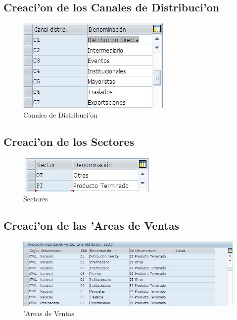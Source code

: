 \subsection*{Creaci'on de los Canales de Distribuci'on}
\begin{figure}[H]
\centering
\includegraphics[scale=0.65,type=jpg,ext=.jpg,read=.jpg]{figures/CanalesDistribucion}
\caption{Canales de Distribuci'on}
\label{fig:canales}
\end{figure}

\subsection*{Creaci'on de los Sectores}
\begin{figure}[H]
\centering
\includegraphics[scale=0.65,type=jpg,ext=.jpg,read=.jpg]{figures/Sectores}
\caption{Sectores}
\label{fig:sectores}
\end{figure}

\subsection*{Creaci'on de las 'Areas de Ventas}
\begin{figure}[H]
\centering
\includegraphics[scale=0.65,type=jpg,ext=.jpg,read=.jpg]{figures/AreaVentas}
\caption{'Areas de Ventas}
\label{fig:areas}
\end{figure}

